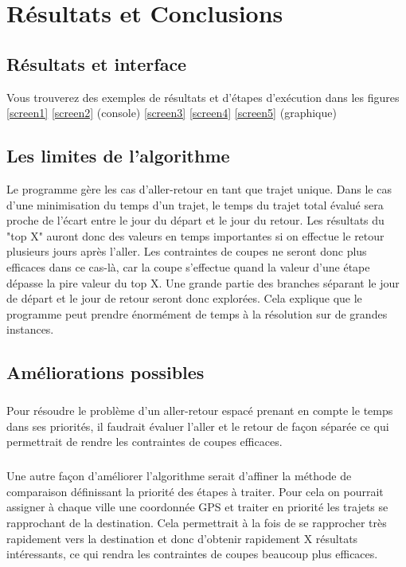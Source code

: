 \documentclass[a4paper,10pt,twoside]{report}
\begin{document}
    
\chapter{Résultats et Conclusions}
    \section{Résultats et interface}
        Vous trouverez des exemples de résultats et d'étapes d'exécution dans les figures \ref{screen1} \ref{screen2} (console) \ref{screen3} \ref{screen4} \ref{screen5} (graphique)
    
    
    
    \section{Les limites de l'algorithme}
    Le programme gère les cas d'aller-retour en tant que trajet unique. Dans le cas d'une minimisation du temps d'un trajet, le temps du trajet total évalué sera proche de l'écart entre le jour du départ et le jour du retour. Les résultats du "top X" auront donc des valeurs en temps importantes si on effectue le retour plusieurs jours après l'aller. Les contraintes de coupes ne seront donc plus efficaces dans ce cas-là, car la coupe s'effectue quand la valeur d'une étape dépasse la pire valeur du top X. Une grande partie des branches séparant le jour de départ et le jour de retour seront donc explorées. Cela explique que le programme peut prendre énormément de temps à la résolution sur de grandes instances. 
    
    
    
    \section{Améliorations possibles}
    \paragraph{}Pour résoudre le problème d'un aller-retour espacé prenant en compte le temps dans ses priorités, il faudrait évaluer l'aller et le retour de façon séparée ce qui permettrait de rendre les contraintes de coupes efficaces.
    \paragraph{}Une autre façon d'améliorer l'algorithme serait d'affiner la méthode de comparaison définissant la priorité des étapes à traiter. Pour cela on pourrait assigner à chaque ville une coordonnée GPS et traiter en priorité les trajets se rapprochant de la destination. Cela permettrait à la fois de se rapprocher très rapidement vers la destination et donc d'obtenir rapidement X résultats intéressants, ce qui rendra les contraintes de coupes beaucoup plus efficaces.  
 
\end{document}
